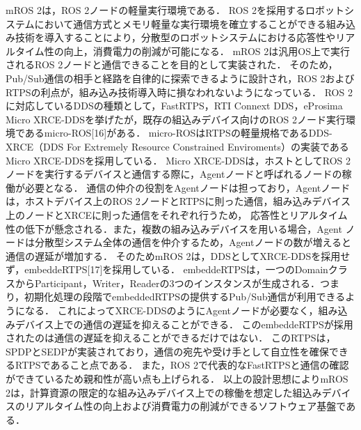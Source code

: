 mROS 2は，ROS 2ノードの軽量実行環境である．
ROS 2を採用するロボットシステムにおいて通信方式とメモリ軽量な実行環境を確立することができる組み込み技術を導入することにより，分散型のロボットシステムにおける応答性やリアルタイム性の向上，消費電力の削減が可能になる．
mROS 2は汎用OS上で実行されるROS 2ノードと通信できることを目的として実装された．
そのため，Pub/Sub通信の相手と経路を自律的に探索できるように設計され，ROS 2およびRTPSの利点が，組み込み技術導入時に損なわれないようになっている．
ROS 2に対応しているDDSの種類として，FastRTPS，RTI Connext DDS，eProsima Micro XRCE-DDSを挙げたが，既存の組込みデバイス向けのROS 2ノード実行環境であるmicro-ROS[16]がある．
micro-ROSはRTPSの軽量規格であるDDS-XRCE（DDS For Extremely Resource Constrained Enviroments）の実装であるMicro XRCE-DDSを採用している．
Micro XRCE-DDSは，ホストとしてROS 2ノードを実行するデバイスと通信する際に，Agentノードと呼ばれるノードの稼働が必要となる．
通信の仲介の役割をAgentノードは担っており，Agentノードは，ホストデバイス上のROS 2ノードとRTPSに則った通信，組み込みデバイス上のノードとXRCEに則った通信をそれぞれ行うため，
応答性とリアルタイム性の低下が懸念される．また，複数の組み込みデバイスを用いる場合，Agent ノードは分散型システム全体の通信を仲介するため，Agentノードの数が増えると通信の遅延が増加する．
そのためmROS 2は，DDSとしてXRCE-DDSを採用せず，embeddeRTPS[17]を採用している．
embeddeRTPSは，一つのDomainクラスからParticipant，Writer，Readerの3つのインスタンスが生成される．つまり，初期化処理の段階でembeddedRTPSの提供するPub/Sub通信が利用できるようになる．
これによってXRCE-DDSのようにAgentノードが必要なく，組み込みデバイス上での通信の遅延を抑えることができる．
このembeddeRTPSが採用されたのは通信の遅延を抑えることができるだけではない．
このRTPSは，SPDPとSEDPが実装されており，通信の宛先や受け手として自立性を確保できるRTPSであること点である．
また，ROS 2で代表的なFastRTPSと通信の確認ができているため親和性が高い点も上げられる．
以上の設計思想によりmROS 2は，計算資源の限定的な組み込みデバイス上での稼働を想定した組込みデバイスのリアルタイム性の向上および消費電力の削減ができるソフトウェア基盤である．
